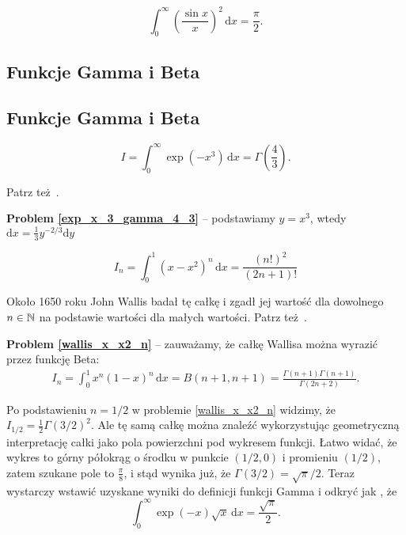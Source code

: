 \begin{problem}
    \begin{equation}
        \int_0^\infty \left(\frac {\sin x}{x}\right)^2 \,\mathrm{d} x = \frac \pi 2.
    \end{equation}
\end{problem}

\subsection{Funkcje Gamma i Beta}
\subsection{Funkcje Gamma i Beta}
\begin{problem}
\label{exp_x_3_gamma_4_3}%
    \begin{equation}
        I = \int_{0}^\infty \exp \left( -x^3 \right) \,\mathrm{d} x = \Gamma \left( \frac 4 3 \right).
    \end{equation}
\end{problem}

Patrz też \cite[s. 119]{nahin15}.

\textbf{Problem \ref{exp_x_3_gamma_4_3}} -- podstawiamy $y = x^3$, wtedy $\mathrm{d}x = \frac 1 3 y^{-2/3} \mathrm{d}y$

\begin{problem}
\label{wallis_x_x2_n}%
    \begin{equation}
        I_n = \int_{0}^1 (x-x^2)^n \,\mathrm{d} x = \frac{(n!)^2}{(2n+1)!}
    \end{equation}
\end{problem}

Około 1650 roku John Wallis badał tę całkę i zgadł jej wartość dla dowolnego $n \in {\mathbb N}$ na podstawie wartości dla małych wartości.
Patrz też \cite[s. 119-122]{nahin15}.

\textbf{Problem \ref{wallis_x_x2_n}} -- zauważamy, że całkę Wallisa można wyrazić przez funkcję Beta:
\begin{align}
	I_n = \int_{0}^1 x^n (1-x)^n \,\mathrm{d} x = B(n+1, n+1) = \frac{\Gamma(n+1) \Gamma(n+1)}{\Gamma(2n+2)}.
\end{align}

Po podstawieniu $n = 1/2$ w problemie \ref{wallis_x_x2_n} widzimy, że $I_{1/2} = \frac 1 2 \Gamma(3/2)^2$.
Ale tę samą całkę można znaleźć wykorzystując geometryczną interpretację całki jako pola powierzchni pod wykresem funkcji.
Łatwo widać, że wykres to górny półokrąg o środku w punkcie $(1/2, 0)$ i promieniu $(1/2)$, zatem szukane pole to $\frac \pi 8$, i stąd wynika już, że $\Gamma(3/2) = \sqrt{\pi}/2$.
Teraz wystarczy wstawić uzyskane wyniki do definicji funkcji Gamma i odkryć jak \cite[s. 123]{nahin15}, że
\begin{equation}
    \int_{0}^\infty \exp(-x) \sqrt{x} \,\mathrm{d} x = \frac{\sqrt \pi}{2}.
\end{equation}

